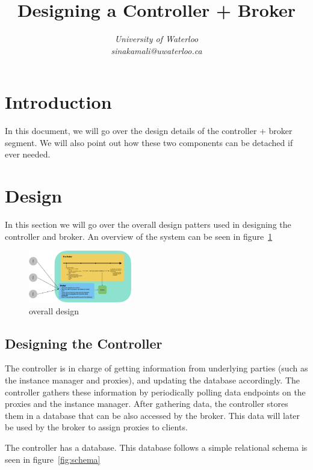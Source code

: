 \documentclass[conference]{IEEEtran}
\begin{document}
\title{Designing a Controller + Broker}

\author{
\textit{University of Waterloo}\\
\textit{sinakamali@uwaterloo.ca}
}

\maketitle

\section{Introduction}
In this document, we will go over the design details of the controller + broker segment. We will also point out how these two components can be detached if ever needed.

\section{Design}
In this section we will go over the overall design patters used in designing the controller and broker. An overview of the system can be seen in figure~\ref*{fig:odesign}

\begin{figure}[h]
    \centering
    \includegraphics[width=0.4\textwidth]{design.jpeg}
    \caption{overall design}
    \label{fig:odesign}
\end{figure}

\subsection{Designing the Controller}
The controller is in charge of getting information from underlying parties (such as the instance manager and proxies), and updating the database accordingly. The controller gathers these information by periodically polling data endpoints on the proxies and the instance manager. After gathering data, the controller stores them in a database that can be also accessed by the broker. This data will later be used by the broker to assign proxies to clients.

The controller has a database. This database follows a simple relational schema is seen in figure~\ref*{fig:schema}
\end{document}
